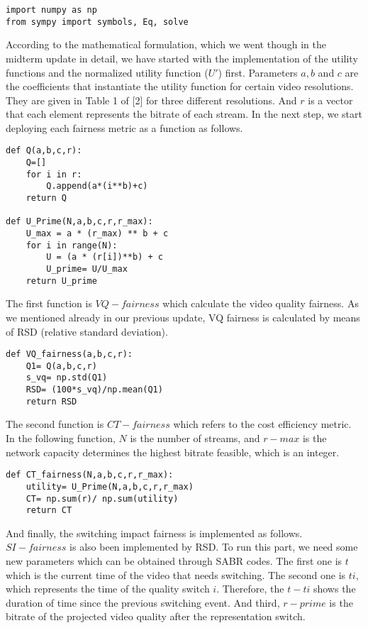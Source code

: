 \documentclass{article}
\begin{document}
\begin{verbatim}
import numpy as np
from sympy import symbols, Eq, solve
\end{verbatim}

According to the mathematical formulation, which we went though in the midterm update in detail, we have started with the implementation of the utility functions and the normalized utility function ($U'$) first. Parameters $a, b$ and $c$ are the coefficients that instantiate the utility function for certain video resolutions. They are given in Table 1 of [2] for three different resolutions. And $r$ is a vector that each element represents the bitrate of each stream. In the next step, we start deploying each fairness metric as a function as follows.

\begin{verbatim}
def Q(a,b,c,r):
    Q=[]
    for i in r:
        Q.append(a*(i**b)+c)
    return Q
    
def U_Prime(N,a,b,c,r,r_max):
    U_max = a * (r_max) ** b + c
    for i in range(N):
        U = (a * (r[i])**b) + c
        U_prime= U/U_max
    return U_prime
\end{verbatim}

The first function is $VQ-fairness$ which calculate the video quality fairness. As we mentioned already in our previous update, VQ fairness is calculated by means of RSD (relative standard deviation).

\begin{verbatim}
def VQ_fairness(a,b,c,r):
    Q1= Q(a,b,c,r)
    s_vq= np.std(Q1)
    RSD= (100*s_vq)/np.mean(Q1)
    return RSD
\end{verbatim}

The second function is $CT-fairness$ which refers to the cost efficiency metric. In the following function, $N$ is the number of streams, and $r-max$ is the network capacity determines the highest bitrate feasible, which is an integer. 

\begin{verbatim}
def CT_fairness(N,a,b,c,r,r_max):
    utility= U_Prime(N,a,b,c,r,r_max)
    CT= np.sum(r)/ np.sum(utility)
    return CT
\end{verbatim}

And finally, the switching impact fairness is implemented as follows. $SI-fairness$ is also been implemented by RSD. To run this part, we need some new parameters which can be obtained through SABR codes. The first one is $t$ which is the current time of the video that needs switching. The second one is $ti$, which represents the time of the quality switch $i$. Therefore, the $t-ti$ shows the duration of time since the previous switching event. And third, $r-prime$ is the bitrate of the projected video quality after the representation switch.
\end{document}
